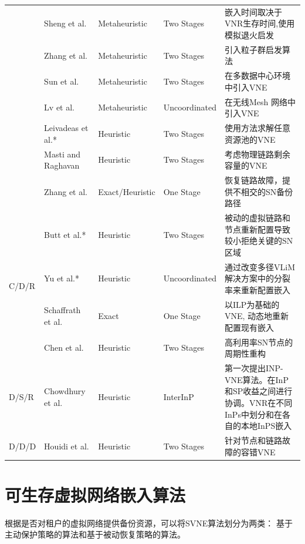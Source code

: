 \begin{longtable}[h]{@{}lm{}m{}m{}m{}}
 & Sheng et al.  \cite{zhang2011fell}  & Metaheuristic & Two Stages & 嵌入时间取决于VNR生存时间,使用模拟退火启发\\
 & Zhang et al.  \cite{zhang2013unified}  & Metaheuristic & Two Stages & 引入粒子群启发算法\\
 & Sun et al.  \cite{sun2012optimal}  & Metaheuristic & Two Stages & 在多数据中心环境中引入VNE\\
 & Lv et al.  \cite{lv2012virtual}  & Metaheuristic & Uncoordinated & 在无线Mesh 网络中引入VNE\\
 & Leivadeas et al.*  \cite{leivadeas2013efficient}  & Heuristic & Two Stages & 使用方法\cite{chowdhury2012vineyard}求解任意资源池的VNE\\
 & Masti and Raghavan  \cite{masti2012vna}  & Heuristic & Two Stages & 考虑物理链路剩余容量的VNE\\
 & Zhang et al.  \cite{zhang2012achieving}  & Exact/Heuristic & One Stage & 恢复链路故障，提供不相交的SN备份路径\\
\hline
\multirow{4}{*}{C/D/R} & Butt et al.*  \cite{butt2010topology}  & Heuristic & Two Stages & 被动的虚拟链路和节点重新配置导致较小拒绝关键的SN区域\\
 & Yu et al.*  \cite{yu2008rethinking}  & Heuristic & Uncoordinated & 通过改变多径VLiM 解决方案中的分裂率来重新配置嵌入\\
 & Schaffrath et al.  \cite{schaffrath2012optimizing}  & Exact& One Stage & 以ILP为基础的VNE, 动态地重新配置现有嵌入\\
 & Chen et al.  \cite{chen2011algorithm}  & Heuristic & Two Stages & 高利用率SN节点的周期性重构\\
\hline
\multirow{1}{*}{D/S/R} & Chowdhury et al.  \cite{chowdhury2010polyvine}  & Heuristic & InterInP & 第一次提出INP-VNE算法。在InP 和SP收益之间进行协调。VNR在不同InPs中划分和在各自的本地InPS嵌入\\
\hline
\multirow{1}{*}{D/D/D} & Houidi et al.  \cite{houidi2010adaptive}  & Heuristic & Two Stages& 针对节点和链路故障的容错VNE\\
\end{longtable}
\vspace{\baselineskip}\xiaosi
\renewcommand\arraystretch{1.5}


\section{可生存虚拟网络嵌入算法}
根据是否对租户的虚拟网络提供备份资源，可以将SVNE算法划分为两类： 基于主动保护策略的算法和基于被动恢复策略的算法\cite{herker2013survey}。

